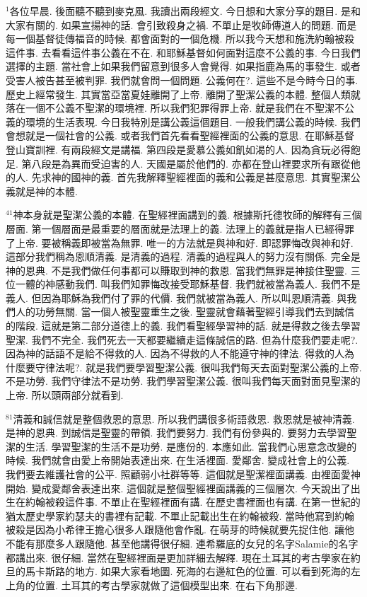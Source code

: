 \documentclass{book}
\begin{document}
$^{1}$各位早晨.
後面聽不聽到麥克風.
我讀出兩段經文.
今日想和大家分享的題目.
是和大家有關的.
如果宣揚神的話.
會引致殺身之禍.
不單止是牧師傳道人的問題.
而是每一個基督徒傳福音的時候.
都會面對的一個危機.
所以我今天想和施洗約翰被殺這件事.
去看看這件事公義在不在.
和耶穌基督如何面對這麼不公義的事.
今日我們選擇的主題.
當社會上如果我們留意到很多人會覺得.
如果指鹿為馬的事發生.
或者受害人被告甚至被判罪.
我們就會問一個問題.
公義何在?.
這些不是今時今日的事.
歷史上經常發生.
其實當亞當夏娃離開了上帝.
離開了聖潔公義的本體.
整個人類就落在一個不公義不聖潔的環境裡.
所以我們犯罪得罪上帝.
就是我們在不聖潔不公義的環境的生活表現.
今日我特別是講公義這個題目.
一般我們講公義的時候.
我們會想就是一個社會的公義.
或者我們首先看看聖經裡面的公義的意思.
在耶穌基督登山寶訓裡.
有兩段經文是講福.
第四段是愛慕公義如飢如渴的人.
因為貪玩必得飽足.
第八段是為異而受迫害的人.
天國是屬於他們的.
亦都在登山裡要求所有跟從他的人.
先求神的國神的義.
首先我解釋聖經裡面的義和公義是甚麼意思.
其實聖潔公義就是神的本體.

$^{41}$神本身就是聖潔公義的本體.
在聖經裡面講到的義.
根據斯托德牧師的解釋有三個層面.
第一個層面是最重要的層面就是法理上的義.
法理上的義就是指人已經得罪了上帝.
要被稱義即被當為無罪.
唯一的方法就是與神和好.
即認罪悔改與神和好.
這部分我們稱為恩順清義.
是清義的過程.
清義的過程與人的努力沒有關係.
完全是神的恩典.
不是我們做任何事都可以賺取到神的救恩.
當我們無罪是神接住聖靈.
三位一體的神感動我們.
叫我們知罪悔改接受耶穌基督.
我們就被當為義人.
我們不是義人.
但因為耶穌為我們付了罪的代價.
我們就被當為義人.
所以叫恩順清義.
與我們人的功勞無關.
當一個人被聖靈重生之後.
聖靈就會藉著聖經引導我們去到誠信的階段.
這就是第二部分道德上的義.
我們看聖經學習神的話.
就是得救之後去學習聖潔.
我們不完全.
我們死去一天都要繼續走這條誠信的路.
但為什麼我們要走呢?.
因為神的話語不是給不得救的人.
因為不得救的人不能遵守神的律法.
得救的人為什麼要守律法呢?.
就是我們要學習聖潔公義.
很叫我們每天去面對聖潔公義的上帝.
不是功勞.
我們守律法不是功勞.
我們學習聖潔公義.
很叫我們每天面對面見聖潔的上帝.
所以頭兩部分就看到.

$^{81}$清義和誠信就是整個救恩的意思.
所以我們講很多術語救恩.
救恩就是被神清義.
是神的恩典.
到誠信是聖靈的帶領.
我們要努力.
我們有份參與的.
要努力去學習聖潔的生活.
學習聖潔的生活不是功勞.
是應份的.
本應如此.
當我們心思意念改變的時候.
我們就會由愛上帝開始表達出來.
在生活裡面.
愛鄰舍.
變成社會上的公義.
我們要去維護社會的公平.
照顧弱小社群等等.
這個就是聖潔裡面講義.
由裡面愛神開始.
變成愛鄰舍表達出來.
這個就是整個聖經裡面講義的三個層次.
今天說出了出生在約翰被殺這件事.
不單止在聖經裡面有講.
在歷史書裡面也有講.
在第一世紀的猶太歷史學家約瑟夫的書裡有記載.
不單止記載出生在約翰被殺.
當時他寫到約翰被殺是因為小希律王擔心很多人跟隨他會作亂.
在萌芽的時候就要先捉住他.
讓他不能有那麼多人跟隨他.
甚至他講得很仔細.
連希羅底的女兒的名字Salamie的名字都講出來.
很仔細.
當然在聖經裡面是更加詳細去解釋.
現在土耳其的考古學家在約旦的馬卡斯路的地方.
如果大家看地圖.
死海的右邊紅色的位置.
可以看到死海的左上角的位置.
土耳其的考古學家就做了這個模型出來.
在右下角那邊.
\end{document}
